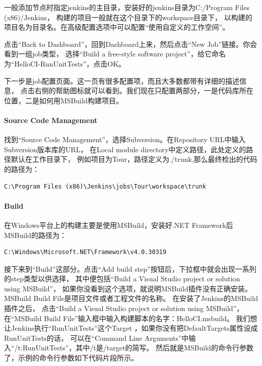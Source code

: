\documentclass{book}
\begin{document}
一般添加节点时指定jenkins的主目录，安装好的jenkins目录为C:/Program Files (x86)/Jenkins，
构建的项目一般就在这个目录下的workspace目录下，
以构建的项目名为目录名。在高级配置选项中可以配置“使用自定义的工作空间”。

点击“Back to Dashboard”，回到Dashboard上来，然后点击“New Job”链接。你会看到一组job类型，
选择“Build a free-style software project”，给它命名为“HelloCI-RunUnitTests”，点击OK。

下一步是job配置页面。这一页有很多配置项，而且大多数都带有详细的描述信息，
点击右侧的帮助图标就可以看到。我们现在只配置两部分，一是代码库所在位置，二是如何用MSBuild构建项目。

\paragraph{Source Code Management}

找到“Source Code Management”，选择Subversion。在Repository URL中输入Subversion版本库的URL，
在Local module directory中定义路径，此处定义的路径默认在工作目录下，
例如项目为Tour，路径定义为./trunk,那么最终检出的代码的路径为：

\begin{lstlisting}
C:\Program Files (x86)\Jenkins\jobs\Tour\workspace\trunk
\end{lstlisting}

\paragraph{Build}

在Windows平台上的构建主要是使用MSBuild，安装好.NET Framework后MSBuild的路径为：

\begin{lstlisting}
C:\Windows\Microsoft.NET\Framework\v4.0.30319
\end{lstlisting}接下来到“Build”这部分。点击“Add build step”按钮后，下拉框中就会出现一系列的step类型以供选择，
其中便包括“Build a Visual Studio project or solution using MSBuild”，
如果你没看到这个选项，就说明MSBuild插件没有正确安装。
MSBuild Build File是项目文件或者工程文件的名称。
在安装了Jenkins的MSBuild插件之后，
点击“Build a Visual Studio project or solution using MSBuild”，
在“MSBuild Build File”输入框中输入构建脚本的名字：HelloCI.msbuild。
我们想让Jenkins执行“RunUnitTests”这个Target ，如果你没有把DefaultTargets属性设成RunUnitTests的话，
可以在“Command Line Arguments”中输入“/t:RunUnitTests”，其中/t是/target的简写。
然后就是MSBuild的命令行参数了，示例的命令行参数如下代码片段所示。
\end{document}
